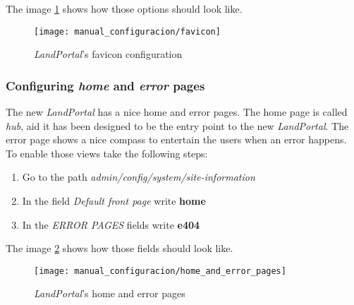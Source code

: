 The image \ref{fig:manual_configuracion_favicon} shows how those options should look like.
\begin{figure}[h]
	\centering
	\texttt{[image: manual\_configuracion/favicon]}
	\caption{\textit{LandPortal}'s favicon configuration}
	\label{fig:manual_configuracion_favicon}
\end{figure}

\subsubsection{Configuring \textit{home} and \textit{error} pages}
The new \textit{LandPortal} has a nice home and error pages.  The home page is called \textit{hub}, aid it has been designed to be the entry point to the new \textit{LandPortal}.  The error page shows a nice compass to entertain the users when an error happens.  To enable those views take the following steps:
\begin{enumerate}
	\item Go to the path \textit{admin/config/system/site-information}
	\item In the field \textit{Default front page} write \textbf{home}
	\item In the \textit{ERROR PAGES} fields write \textbf{e404}
\end{enumerate}

The image \ref{fig:manual_configuracion_homeanderror} shows how those fields should look like.
\begin{figure}[h]
	\centering
	\texttt{[image: manual\_configuracion/home\_and\_error\_pages]}
	\caption{\textit{LandPortal}'s home and error pages}
	\label{fig:manual_configuracion_homeanderror}
\end{figure}

